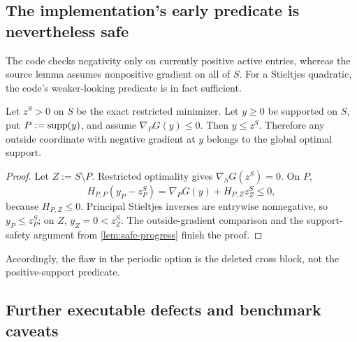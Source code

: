 \documentclass[11pt]{article}
\begin{document}
\subsection{The implementation's early predicate is nevertheless safe}

The code checks negativity only on currently positive active entries, whereas
the source lemma assumes nonpositive gradient on all of $S$.  For a
Stieltjes quadratic, the code's weaker-looking predicate is in fact
sufficient.

\begin{lemma}
\label{lem:positive-support-predicate}
Let $z^S>0$ on $S$ be the exact restricted minimizer.  Let $y\geq0$ be
supported on $S$, put $P:=\operatorname{supp}(y)$, and assume
$\nabla_PG(y)\leq0$.  Then $y\leq z^S$.  Therefore any outside coordinate
with negative gradient at $y$ belongs to the global optimal support.
\end{lemma}

\begin{proof}
Let $Z:=S\setminus P$.  Restricted optimality gives
$\nabla_SG(z^S)=0$.  On $P$,
\[
 H_{P,P}(y_P-z_P^S)
 =\nabla_PG(y)+H_{P,Z}z_Z^S\leq0,
\]
because $H_{P,Z}\leq0$.  Principal Stieltjes inverses are entrywise
nonnegative, so $y_P\leq z_P^S$; on $Z$, $y_Z=0<z_Z^S$.
The outside-gradient comparison and the support-safety argument from
\cref{lem:safe-progress} finish the proof.
\end{proof}

Accordingly, the flaw in the periodic option is the deleted cross block, not
the positive-support predicate.

\subsection{Further executable defects and benchmark caveats}
\end{document}
